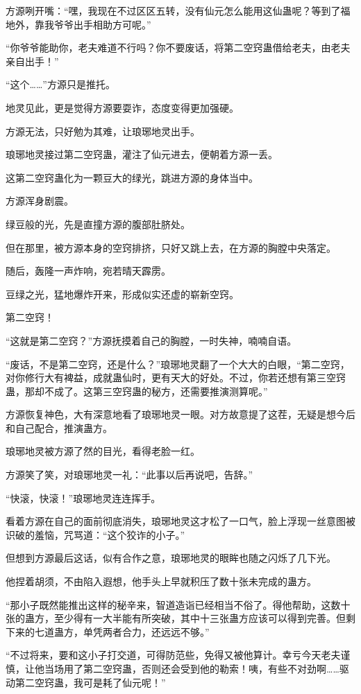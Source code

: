 \begin{this_body}
方源咧开嘴：“嘿，我现在不过区区五转，没有仙元怎么能用这仙蛊呢？等到了福地外，靠我爷爷出手相助方可呢。”

“你爷爷能助你，老夫难道不行吗？你不要废话，将第二空窍蛊借给老夫，由老夫亲自出手！”

“这个……”方源只是推托。

地灵见此，更是觉得方源要耍诈，态度变得更加强硬。

方源无法，只好勉为其难，让琅琊地灵出手。

琅琊地灵接过第二空窍蛊，灌注了仙元进去，便朝着方源一丢。

这第二空窍蛊化为一颗豆大的绿光，跳进方源的身体当中。

方源浑身剧震。

绿豆般的光，先是直撞方源的腹部肚脐处。

但在那里，被方源本身的空窍排挤，只好又跳上去，在方源的胸膛中央落定。

随后，轰隆一声炸响，宛若晴天霹雳。

豆绿之光，猛地爆炸开来，形成似实还虚的崭新空窍。

第二空窍！

“这就是第二空窍？”方源抚摸着自己的胸膛，一时失神，喃喃自语。

“废话，不是第二空窍，还是什么？”琅琊地灵翻了一个大大的白眼，“第二空窍，对你修行大有裨益，成就蛊仙时，更有天大的好处。不过，你若还想有第三空窍蛊，那却不成了。这第三空窍蛊的秘方，还需要推演测算呢。”

方源恢复神色，大有深意地看了琅琊地灵一眼。对方故意提了这茬，无疑是想今后和自己配合，推演蛊方。

琅琊地灵被方源了然的目光，看得老脸一红。

方源笑了笑，对琅琊地灵一礼：“此事以后再说吧，告辞。”

“快滚，快滚！”琅琊地灵连连挥手。

看着方源在自己的面前彻底消失，琅琊地灵这才松了一口气，脸上浮现一丝意图被识破的羞恼，咒骂道：“这个狡诈的小子。”

但想到方源最后这话，似有合作之意，琅琊地灵的眼眸也随之闪烁了几下光。

他捏着胡须，不由陷入遐想，他手头上早就积压了数十张未完成的蛊方。

“那小子既然能推出这样的秘辛来，智道造诣已经相当不俗了。得他帮助，这数十张的蛊方，至少得有一大半能有所突破，其中十三张蛊方应该可以得到完善。但剩下来的七道蛊方，单凭两者合力，还远远不够。”

“不过将来，要和这小子打交道，可得防范些，免得又被他算计。幸亏今天老夫谨慎，让他当场用了第二空窍蛊，否则还会受到他的勒索！咦，有些不对劲啊……驱动第二空窍蛊，我可是耗了仙元呢！”


\end{this_body}
